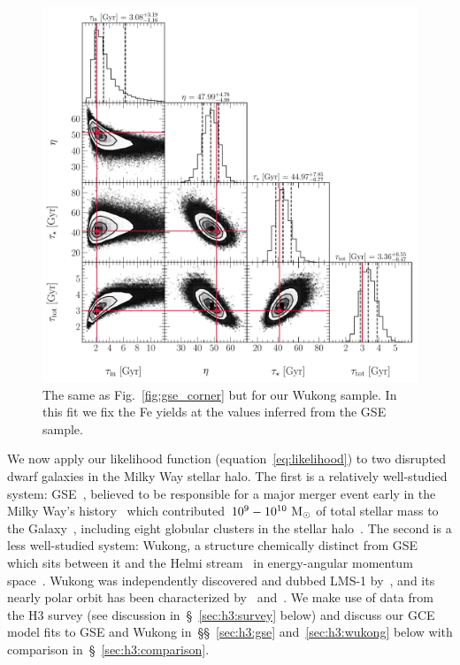 \documentclass[ms.tex]{subfiles}
\begin{document}
\begin{figure}
\centering
\includegraphics[scale = 0.52]{wukong_512k.pdf}
\caption{
The same as Fig.~\ref{fig:gse_corner} but for our Wukong sample.
In this fit we fix the Fe yields at the values inferred from the GSE sample.
}
\label{fig:wukong_corner}
\end{figure}

We now apply our likelihood function (equation~\ref{eq:likelihood}) to two
disrupted dwarf galaxies in the Milky Way stellar halo.
The first is a relatively well-studied system: GSE~\citep{Belokurov2018,
Helmi2018}, believed to be responsible for a major merger event early in the
Milky Way's history~\citep{Chaplin2020} which contributed~$10^9 - 10^{10}~\text{M}_\odot$
of total stellar mass to the Galaxy~\citep{Deason2019, Fattahi2019,
Mackereth2019, Vincenzo2019}, including eight globular clusters in the stellar
halo~\citep{Myeong2018}.
The second is a less well-studied system: Wukong, a structure chemically
distinct from GSE which sits between it and the Helmi stream~\citep{Helmi1999}
in energy-angular momentum space~\citep{Naidu2020, Naidu2022}.
Wukong was independently discovered and dubbed LMS-1 by~\citep{Yuan2020},
and its nearly polar orbit has been characterized by~\citet{Malhan2021,
Malhan2022} and~\citet{Shank2022}.
We make use of data from the H3 survey (see discussion
in~\S~\ref{sec:h3:survey} below) and discuss our GCE model fits to GSE and
Wukong in~\S\S~\ref{sec:h3:gse} and~\ref{sec:h3:wukong} below with comparison
in~\S~\ref{sec:h3:comparison}.
\end{document}

